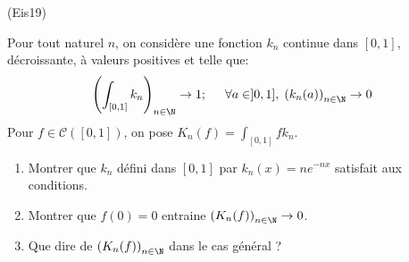 \begin{tiny}(Eis19)\end{tiny} Pour tout naturel $n$, on considère une fonction $k_n$ continue dans $[0,1]$, décroissante, à valeurs positives et telle que:
\begin{displaymath}
 \left( \int_{[0,1]}k_n\right)_{n\in \N} \rightarrow 1;\hspace{0.5cm}
\forall a \in]0,1],\;\left( k_n(a)\right) _{n\in \N}  \rightarrow 0
\end{displaymath}
Pour $f\in\mathcal{C}([0,1])$, on pose $K_n(f) = \int_{[0,1]}fk_n$.
\begin{enumerate}
 \item Montrer que $k_n$ défini dans $[0,1]$ par $k_n(x)=ne^{-nx}$ satisfait aux conditions.
 \item Montrer que $f(0)=0$ entraine $\left( K_n(f)\right) _{n\in \N}\rightarrow 0$.
 \item Que dire de $\left( K_n(f)\right) _{n\in \N}$ dans le cas général ?
\end{enumerate}
